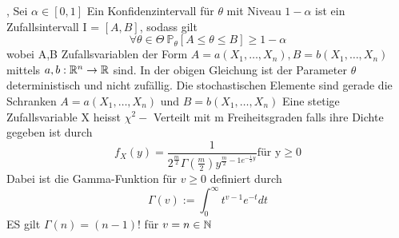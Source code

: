 \sep
\Def[2.1] \newline
Sei \( \alpha \in [0,1]\) Ein Konfidenzintervall für \( \theta \) mit Niveau \(1 - \alpha \) ist ein Zufallsintervall I = \([A,B ]\), sodass gilt
\[ \forall \theta \in \Theta \ \mathbb{P}_\theta[A \leq \theta \leq B ] \geq 1 - \alpha \]
wobei A,B Zufallsvariablen der Form \( A = a(X_1, \dots , X_n ), B = b(X_1, \dots , X_n )\) mittels \( a,b : \mathbb{R}^n \rightarrow \mathbb{R} \) sind.
\Bem[2.2] \newline
In der obigen Gleichung ist der Parameter  \( \theta \) deterministisch und nicht zufällig. Die stochastischen Elemente sind gerade die Schranken \( A = a(X_1, \dots , X_n )\) und \( B = b(X_1, \dots , X_n)\)
\Def[2.3] \newline
Eine stetige Zufallsvariable X heisst \( \chi^2-\) Verteilt mit m Freiheitsgraden falls ihre Dichte gegeben ist durch \[ f_X(y) = \frac{1}{2^{\frac{m}{2}}\Gamma(\frac{m}{2})y^{\frac{m}{2}-1e^{-\frac{1}{2}y}}} \text{für y} \geq 0\]
Dabei ist die Gamma-Funktion für \( v \geq 0\) definiert durch \[ \Gamma(v) := \int_0^\infty t^{v-1}e^{-t}dt\]
ES gilt \(\Gamma(n) = (n-1)! \) für \(v = n \in \mathbb{N} \)
\Bem[2.3A]
